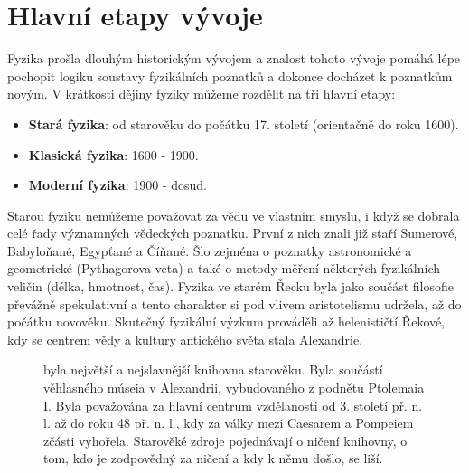   
    
  \section{Hlavní etapy vývoje}\label{fyz:IchapIsecIII}
    Fyzika prošla dlouhým historickým vývojem a znalost tohoto vývoje pomáhá lépe pochopit logiku 
    soustavy fyzikálních poznatků a dokonce do\-cházet k poznatkům novým. V krátkosti dějiny 
    fyziky můžeme rozdělit na tři hlavní etapy:
    \begin{itemize}[noitemsep]
     	\item \textbf{Stará fyzika}: od starověku do počátku 17. století (orientačně do roku 1600).
      \item \textbf{Klasická fyzika}: 1600 - 1900.
      \item \textbf{Moderní fyzika}: 1900 - dosud.
    \end{itemize}
    Starou fyziku nemůžeme považovat za vědu ve vlastním smyslu, i když se dobrala celé řady 
    významných vědeckých poznatku. První z nich znali již staří Sumerové, Babyloňané, Egypťané a 
    Číňané. Šlo zejména o  poznatky astronomické a geometrické (Pythagorova veta) a také o metody 
    měření některých fyzikálních veličin (délka, hmotnost, čas). Fyzika ve starém Řecku byla jako 
    součást filosofie převážně spekulativní a tento charakter si pod vlivem aristotelismu udržela, 
    až do počátku novověku. Skutečný fyzikální výzkum prováděli až helenističtí Řekové, kdy se 
    centrem vědy a kultury antického světa stala Alexandrie. 
    
    \begin{figure}[ht!]  %
      \centering
      \caption{ \wikiAlexLib byla největší a nejslavnější knihovna starověku. Byla součástí
                věhlasného múseia v Alexandrii, vybudovaného z podnětu Ptolemaia I. Byla považována
                za hlavní centrum vzdělanosti od 3. století př. n. l. až do roku 48 př. n. l., kdy
                za války mezi Caesarem a Pompeiem zčásti vyhořela. Starověké zdroje pojednávají o
                ničení knihovny, o tom, kdo je zodpovědný za ničení a kdy k němu došlo, se liší.}
      \label{fyz:fig894}
    \end{figure} 

